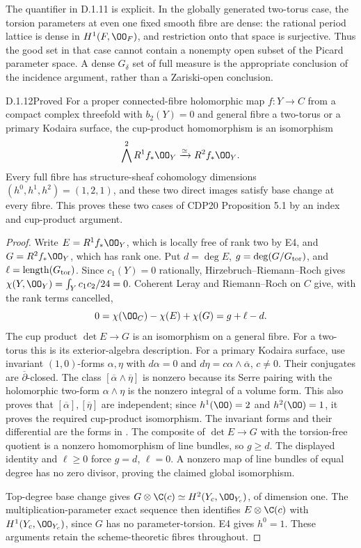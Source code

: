 The quantifier in D.1.11 is explicit. In the globally generated
two-torus case, the torsion parameters at even one fixed smooth fibre are
dense: the rational period lattice is dense in
$H^1(F,\OO_F)$, and restriction onto that space is surjective.
Thus the good set in that case cannot contain a nonempty open
subset of the Picard parameter space. A dense $G_\delta$ set of
full measure is the appropriate conclusion of the incidence
argument, rather than a Zariski-open conclusion.



\begin{idstatement}{D.1.12}{Proved}\label{st:D.1.12}
For a proper connected-fibre holomorphic map $f:Y\to C$ from a
compact complex threefold with $b_2(Y)=0$ and general fibre a
two-torus or a primary Kodaira surface, the cup-product homomorphism
is an isomorphism
\[
\bigwedge^2R^1f_*\OO_Y\xrightarrow{\simeq}R^2f_*\OO_Y.
\]
Every full fibre has structure-sheaf cohomology dimensions
$(h^0,h^1,h^2)=(1,2,1)$, and these two direct images satisfy
base change at every fibre. This proves these two cases of CDP20
Proposition 5.1 by an index and cup-product argument.
\end{idstatement}
\begin{proof}
Write $E=R^1f_*\OO_Y$, which is locally free of rank two by E4,
and $G=R^2f_*\OO_Y$, which has rank one. Put
$d=\deg E$, $g=\deg(G/G_{\rm tor})$, and
$\ell=\operatorname{length}(G_{\rm tor})$.
Since $c_1(Y)=0$ rationally, Hirzebruch--Riemann--Roch gives
$\chi(Y,\OO_Y)=\int_Yc_1c_2/24=0$.
Coherent Leray and Riemann--Roch on $C$ give, with the rank terms
cancelled,
\[
0=\chi(\OO_C)-\chi(E)+\chi(G)=g+\ell-d.
\]
The cup product $\det E\to G$ is an isomorphism on a general
fibre. For a two-torus this is its exterior-algebra description.
For a primary Kodaira surface, use invariant $(1,0)$-forms
$\alpha,\eta$ with $d\alpha=0$ and
$d\eta=c\alpha\wedge\overline\alpha$, $c\ne0$.
Their conjugates are $\overline\partial$-closed. The class
$[\overline\alpha\wedge\overline\eta]$ is nonzero because its
Serre pairing with the holomorphic two-form $\alpha\wedge\eta$
is the nonzero integral of a volume form. This also proves that
$[\overline\alpha],[\overline\eta]$ are independent; since
$h^1(\OO)=2$ and $h^2(\OO)=1$, it proves the required cup-product
isomorphism. The invariant forms and their differential are
the forms in \cite[\S3, equations (9)--(12)]{Borcea1984}.
The composite of $\det E\to G$ with the torsion-free quotient is a
nonzero homomorphism of line bundles, so $g\geq d$. The displayed
identity and $\ell\geq0$ force $g=d$, $\ell=0$. A nonzero map
of line bundles of equal degree has no zero divisor, proving the
claimed global isomorphism.

Top-degree base change gives
$G\otimes\C(c)\simeq H^2(Y_c,\OO_{Y_c})$, of dimension one.
The multiplication-parameter exact sequence then identifies
$E\otimes\C(c)$ with $H^1(Y_c,\OO_{Y_c})$, since $G$ has no
parameter-torsion. E4 gives $h^0=1$. These arguments retain the
scheme-theoretic fibres throughout.
\end{proof}


